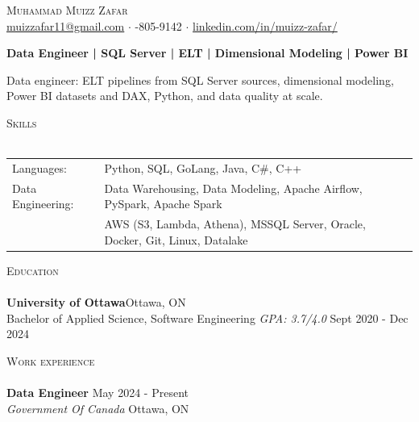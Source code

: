 \documentclass[a4paper]{article}
\newcommand{\lineunder} {
    \vspace*{-8pt} \\
    \hspace*{-18pt} \hrulefill \\
}
\newcommand{\header} [1] {
    {\hspace*{-18pt}\vspace*{6pt} \textsc{#1}}
    \vspace*{-6pt} \lineunder
}
\begin{document}
\vspace*{-40pt}
\vspace*{-10pt}
\begin{center}
	{\Huge \scshape {Muhammad Muizz Zafar}}\\
	\faSend \space \href{mailto:muizzafar11@gmail.com}{muizzafar11@gmail.com} $\cdot$ \faPhoneSquare {}-805-9142 $\cdot$ \faLinkedinSquare \space \href{https://www.linkedin.com/in/muizz-zafar/}{linkedin.com/in/muizz-zafar/}
	\\
\end{center}
\vspace{-5pt}
\begin{center}
\textbf{Data Engineer | SQL Server | ELT | Dimensional Modeling | Power BI}
\end{center}
\begin{center}
Data engineer: ELT pipelines from SQL Server sources, dimensional modeling, Power BI datasets and DAX, Python, and data quality at scale.
\end{center}
\header{Skills}
\begin{tabular}{ l l }
	Languages: & Python, SQL, GoLang, Java, C\#, C++ \\
Data Engineering: & Data Warehousing, Data Modeling, Apache Airflow, PySpark, Apache Spark\\
& AWS (S3, Lambda, Athena), MSSQL Server, Oracle, Docker, Git, Linux, Datalake
\end{tabular}
\header{Education}
\textbf{University of Ottawa}\hfill Ottawa, ON\\
Bachelor of Applied Science, Software Engineering \textit{GPA: 3.7/4.0} \hfill Sept 2020 - Dec 2024\\
\vspace{1mm}
\header{Work experience}
\vspace{1.5mm}
\textbf{Data Engineer} \hfill May 2024 - Present\\
\textit{Government Of Canada} \hfill Ottawa, ON\\
\vspace{-2mm}
\end{document}
